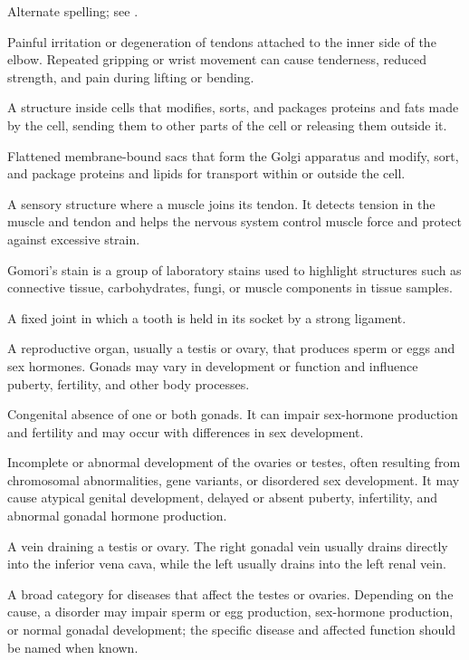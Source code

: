  Alternate spelling; see .

 Painful irritation or degeneration of tendons attached to the inner side of the elbow. Repeated gripping or wrist movement can cause tenderness, reduced strength, and pain during lifting or bending.

 A structure inside cells that modifies, sorts, and packages proteins and fats made by the cell, sending them to other parts of the cell or releasing them outside it.

 Flattened membrane-bound sacs that form the Golgi apparatus and modify, sort, and package proteins and lipids for transport within or outside the cell.

 A sensory structure where a muscle joins its tendon. It detects tension in the muscle and tendon and helps the nervous system control muscle force and protect against excessive strain.

 Gomori's stain is a group of laboratory stains used to highlight structures such as connective tissue, carbohydrates, fungi, or muscle components in tissue samples.

 A fixed joint in which a tooth is held in its socket by a strong ligament.

 A reproductive organ, usually a testis or ovary, that produces sperm or eggs and sex hormones. Gonads may vary in development or function and influence puberty, fertility, and other body processes.

 Congenital absence of one or both gonads. It can impair sex-hormone production and fertility and may occur with differences in sex development.

 Incomplete or abnormal development of the ovaries or testes, often resulting from
chromosomal abnormalities, gene variants, or disordered sex development. It may cause
atypical genital development, delayed or absent puberty, infertility, and abnormal
gonadal hormone production.

 A vein draining a testis or ovary. The right gonadal vein usually drains directly into the inferior vena cava, while the left usually drains into the left renal vein.

 A broad category for diseases that affect the testes or ovaries. Depending on the cause, a disorder may impair sperm or egg production, sex-hormone production, or normal gonadal development; the specific disease and affected function should be named when known.

